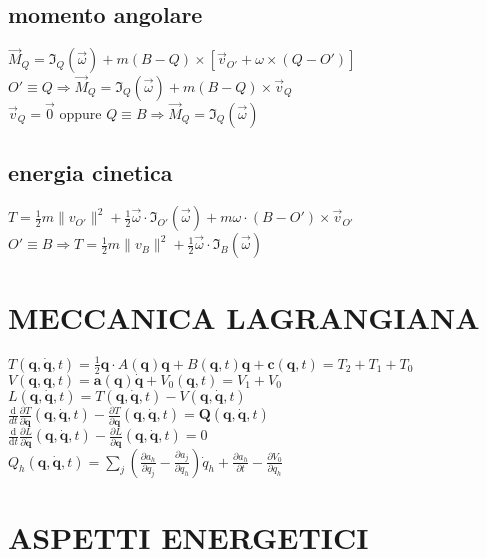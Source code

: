 \documentclass[10pt,a4paper,landscape]{article}
\begin{document}
\begin{multicols}{3}
	\subsection{momento angolare}
	$\vec M_Q=\mathfrak{I}_Q(\vec \omega)+m(B-Q) \times [\vec v_{O'}+\omega \times (Q-O')]$\\
	$O'\equiv Q \Longrightarrow \vec M_Q=\mathfrak{I}_Q(\vec \omega)+m(B-Q) \times \vec v_Q$\\
	$\vec v_Q=\vec 0$ oppure $Q\equiv B \Longrightarrow \vec M_Q=\mathfrak{I}_Q(\vec \omega)$\\

	\subsection{energia cinetica}
	$T=\frac12 m \|v_{O'}\|^2+\frac12 \vec \omega \cdot \mathfrak{I}_{O'}(\vec \omega)+m \omega \cdot (B-O') \times \vec v_{O'}$\\
	$O' \equiv B \Longrightarrow T=\frac12 m \|v_B\|^2+\frac12 \vec \omega \cdot \mathfrak{I}_B(\vec \omega)$
\vfill\null
\columnbreak

\section{MECCANICA LAGRANGIANA}
$T(\mathbf{q},\dot{\mathbf{q}},t)=\frac 1 2 \mathbf{q}\cdot A(\mathbf{q})\mathbf{q}+B(\mathbf{q},t)\mathbf{q}+\mathbf{c}(\mathbf{q},t)=T_2+T_1+T_0$\\
$V(\mathbf{q},\mathbf{q},t)=\mathbf{a}(\mathbf{q})\dot{\mathbf{q}}+V_0(\mathbf{q},t)=V_1+V_0$\\
$L(\mathbf{q},\dot{\mathbf{q}},t)=T(\mathbf{q},\dot{\mathbf{q}},t)-V(\mathbf{q},\dot{\mathbf{q}},t)$\\
$\frac{\mathrm{d}}{dt}\frac{\partial T}{\partial\dot{\mathbf{q}}}(\mathbf{q},\dot{\mathbf{q}},t)-\frac{\partial T}{\partial \mathbf{q}}(\mathbf{q},\dot{\mathbf{q}},t)=\mathbf{Q}(\mathbf{q},\dot{\mathbf{q}},t)$\\
$\frac{\mathrm{d}}{\mathrm{d}t}\frac{\partial L}{\partial\dot{\mathbf{q}}}(\mathbf{q},\dot{\mathbf{q}},t)-\frac{\partial L}{\partial \mathbf{q}}(\mathbf{q},\dot{\mathbf{q}},t)=0$\\
$Q_h(\mathbf{q},\dot{\mathbf{q}},t)=\sum_j(\frac{\partial a_h}{\partial q_j}-\frac{\partial a_j}{\partial q_h})\dot q_h+\frac{\partial a_h}{\partial t}-\frac{\partial V_0}{\partial q_h}$

\section{ASPETTI ENERGETICI}

\end{multicols}
\end{document}
